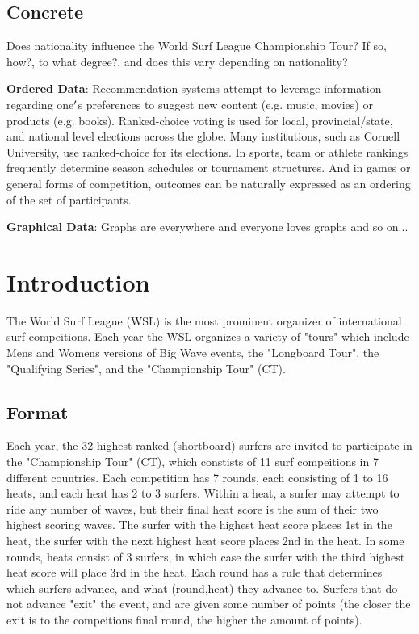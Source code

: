 \documentclass[12pt,a4paper]{article}
\begin{document}
\subsection{Concrete}
Does nationality influence the World Surf League Championship Tour? If so, how?, to what degree?, and does this vary depending on nationality?

\textbf{Ordered Data}: Recommendation systems attempt to leverage information regarding one\ensuremath{\rq}s preferences to suggest new content (e.g. music, movies) or products (e.g. books). Ranked-choice voting is used for local, provincial/state, and national level elections across the globe. Many institutions, such as Cornell University, use ranked-choice for its elections. In sports, team or athlete rankings frequently determine season schedules or tournament structures. And in games or general forms of competition, outcomes can be naturally expressed as an ordering of the set of participants.

\textbf{Graphical Data}: Graphs are everywhere and everyone loves graphs and so on...

\section{Introduction}
The World Surf League (WSL) is the most prominent organizer of international surf compeitions. Each year the WSL organizes a variety of "tours" which include Mens and Womens versions of Big Wave events, the "Longboard Tour", the "Qualifying Series", and the "Championship Tour" (CT). 

\subsection{Format}
Each year, the 32 highest ranked (shortboard) surfers are invited to participate in the "Championship Tour" (CT), which constists of 11 surf compeitions in 7 different countries. Each competition has 7 rounds, each consisting of 1 to 16 heats, and each heat has 2 to 3 surfers. Within a heat, a surfer may attempt to ride any number of waves, but their final heat score is the sum of their two highest scoring waves. The surfer with the highest heat score places 1st in the heat, the surfer with the next highest heat score places 2nd in the heat. In some rounds, heats consist of 3 surfers, in which case the surfer with the third highest heat score will place 3rd in the heat. Each round has a rule that determines which surfers advance, and what (round,heat) they advance to. Surfers that do not advance "exit" the event, and are given some number of points (the closer the exit is to the compeitions final round, the higher the amount of points).
\end{document}
